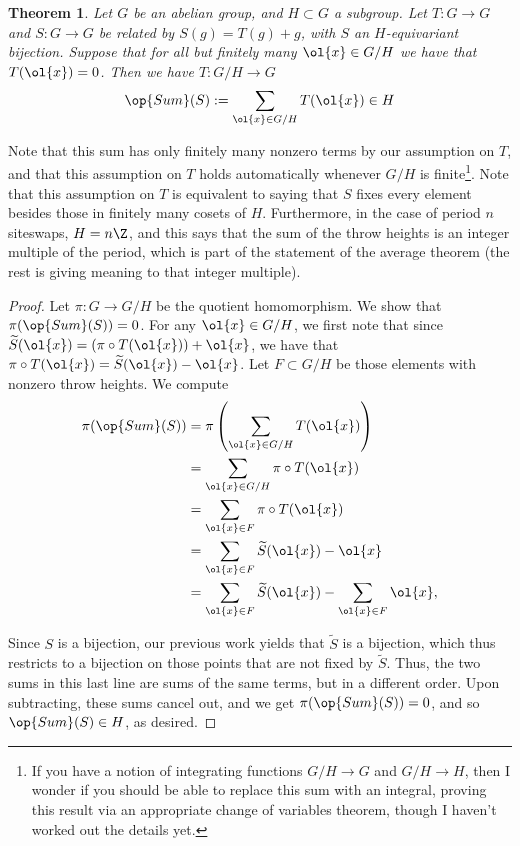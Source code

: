 \documentclass[12nt]{article}
\theoremstyle{plain}
\newtheorem{theorem}{Theorem}
\begin{document}
\begin{theorem}\label{throw_sum_H}
Let $G$ be an abelian group, and $H \subset G$ a subgroup. Let $T : G \to G$ and $S : G \to G$ be related by $S(g) = T(g) + g$, with $S$ an $H$-equivariant bijection. Suppose that for all but finitely many $\ol{x} \in G/H$ we have that $T(\ol{x}) = 0$. Then we have $T : G/H \to G$
\[
\op{Sum}(S) := \sum \limits_{\ol{x} \in G/H} T(\ol{x}) \in H
\]

\end{theorem}
Note that this sum has only finitely many nonzero terms by our assumption on $T$, and that this assumption on $T$ holds automatically whenever $G/H$ is finite\footnote{If you have a notion of integrating functions $G/H \to G$ and $G/H \to H$, then I wonder if you should be able to replace this sum with an integral, proving this result via an appropriate change of variables theorem, though I haven't worked out the details yet.}. Note that this assumption on $T$ is equivalent to saying that $S$ fixes every element besides those in finitely many cosets of $H$. 
 Furthermore, in the case of period $n$ siteswaps, $H = n\Z$, and this says that the sum of the throw heights is an integer multiple of the period, which is part of the statement of the average theorem (the rest is giving meaning to that integer multiple).
\begin{proof}
Let $\pi : G \to G/H$ be the quotient homomorphism. We show that $\pi(\op{Sum}(S)) = 0$. For any $\ol{x} \in G/H$, we first note that since $\widetilde{S}(\ol{x}) = (\pi \circ T(\ol{x})) + \ol{x}$, we have that $\pi \circ T(\ol{x}) = \widetilde{S}(\ol{x}) - \ol{x}$. Let $F \subset G/H$ be those elements with nonzero throw heights. We compute
\begin{align*}
\pi(\op{Sum}(S)) &= \pi \left(\sum \limits_{\ol{x} \in G/H} T(\ol{x}) \right) \\
	&= \sum \limits_{\ol{x} \in G/H} \pi \circ T(\ol{x}) \\
	&= \sum \limits_{\ol{x} \in F} \pi \circ T(\ol{x}) \\
	&= \sum \limits_{\ol{x} \in F} \widetilde{S}(\ol{x}) - \ol{x} \\
	&= \sum \limits_{\ol{x} \in F} \widetilde{S}(\ol{x}) - \sum \limits_{\ol{x} \in F} \ol{x},
\end{align*}

Since $S$ is a bijection, our previous work yields that $\widetilde{S}$ is a bijection, which thus restricts to a bijection on those points that are not fixed by $\widetilde{S}$. Thus, the two sums in this last line are sums of the same terms, but in a different order. Upon subtracting, these sums cancel out, and we get $\pi(\op{Sum}(S)) = 0$, and so $\op{Sum}(S) \in H$, as desired. 

\end{proof}
\end{document}
